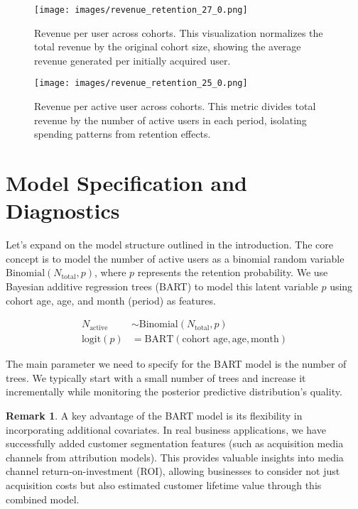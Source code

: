 \documentclass[11pt]{amsart}
\theoremstyle{definition}
\newtheorem{remark}{Remark}
\begin{document}
\begin{figure}
    \centering
    \texttt{[image: images/revenue\_retention\_27\_0.png]}
    \caption{Revenue per user across cohorts. This visualization normalizes the total revenue by the original cohort size,
        showing the average revenue generated per initially acquired user.}
    \label{fig:revenue_per_user}
\end{figure}

\begin{figure}
    \centering
    \texttt{[image: images/revenue\_retention\_25\_0.png]}
    \caption{Revenue per active user across cohorts. This metric divides total revenue by the number of active users in each
        period, isolating spending patterns from retention effects.}
    \label{fig:revenue_per_active_user}
\end{figure}

\section{Model Specification and Diagnostics}
Let's expand on the model structure outlined in the introduction. The core concept is to model the number of active users as
a binomial random variable $\text{Binomial}(N_{\text{total}}, p)$, where $p$ represents the retention probability.
We use Bayesian additive regression trees (BART) to model this latent variable $p$ using cohort age, age, and month (period)
as features.

\begin{align*}
    N_{\text{active}} & \sim \text{Binomial}(N_{\text{total}}, p)                  \\
    \textrm{logit}(p) & = \text{BART}(\text{cohort age}, \text{age}, \text{month})
\end{align*}

The main parameter we need to specify for the BART model is the number of trees. We typically start with a small number of
trees and increase it incrementally while monitoring the posterior predictive distribution's quality.

\begin{remark}
    A key advantage of the BART model is its flexibility in incorporating additional covariates. In real business
    applications, we have successfully added customer segmentation features (such as acquisition media channels from
    attribution models). This provides valuable insights into media channel return-on-investment (ROI), allowing businesses
    to consider not just acquisition costs but also estimated customer lifetime value through this combined model.
\end{remark}
\end{document}
